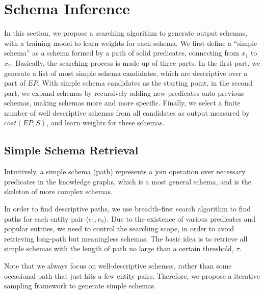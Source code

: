 \section{Schema Inference}
\label{sec:candidate}
In this section, we propose a searching algorithm to generate output schemas,
with a training model to learn weights for each schema.
We first define a ``simple schema'' as a schema formed by a path of
solid predicates, connecting from $x_1$ to $x_2$.
Basically, the searching process is made up of three parts.
In the first part, we generate a list of most simple schema candidates,
which are descriptive over a part of $EP$.
With simple schema candidates as the starting point, in the second part, we expand schemas by
recursively adding new predicates onto previous schemas, making schemas more and more
specific.
Finally, we select a finite number of well descriptive schemas from all candidates
as output measured by $cost(EP, S)$, and learn weights for these schemas.

\subsection{Simple Schema Retrieval}
Intuitively, a simple schema (path) represents a join operation over necessary predicates
in the knowledge graphs, which is a most general schema, and is the skeleton of more complex schemas.

In order to find descriptive paths, we use breadth-first search algorithm
to find paths for each entity pair $\langle e_1, e_2 \rangle$.
Due to the existence of various predicates and popular entities,
we need to control the searching scope, in order to avoid retrieving long-path but
meaningless schemas.
The basic idea is to retrieve all simple schemas with the length
of path no large than a certain threshold, $\tau$.

Note that we always focus on well-descriptive schemas, rather than some occasional path that
just hits a few entity pairs. Therefore, we propose a iterative sampling framework to generate
simple schemas.

